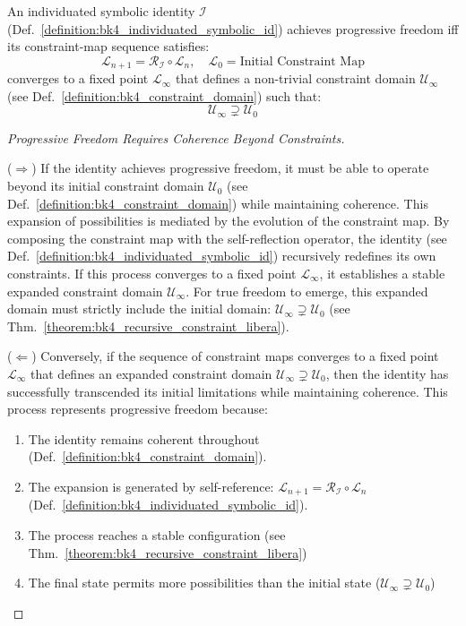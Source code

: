 \begin{theorem} 
\label{theorem:bk4_recursive_constraint_libera}
An individuated symbolic identity $\mathcal{I}$
(Def.~\ref{definition:bk4_individuated_symbolic_id}) achieves progressive
freedom iff its constraint-map sequence satisfies:
\begin{equation}
    \mathcal{L}_{n+1} = \mathcal{R}_{\mathcal{I}} \circ \mathcal{L}_n, \quad \mathcal{L}_0 = \text{Initial Constraint Map}
\end{equation}
converges to a fixed point $\mathcal{L}_{\infty}$ that defines a non-trivial constraint domain $\mathcal{U}_{\infty}$ (see Def.~\ref{definition:bk4_constraint_domain}) such that:
\begin{equation}
    \mathcal{U}_{\infty} \supsetneq \mathcal{U}_0
\end{equation}
\end{theorem}

\begin{proof}[Progressive Freedom Requires Coherence Beyond Constraints]
\label{proof:bk4_progressive_freedom_constraint_expansion}
\leavevmode

($\Rightarrow$) If the identity achieves progressive freedom, it must be able to operate beyond its initial constraint domain $\mathcal{U}_0$ (see Def.~\ref{definition:bk4_constraint_domain}) while maintaining coherence. This expansion of possibilities is mediated by the evolution of the constraint map.
By composing the constraint map with the self-reflection operator, the identity (see Def.~\ref{definition:bk4_individuated_symbolic_id}) recursively redefines its own constraints. If this process converges to a fixed point $\mathcal{L}_{\infty}$, it establishes a stable expanded constraint domain $\mathcal{U}_{\infty}$.
For true freedom to emerge, this expanded domain must strictly include the initial domain: $\mathcal{U}_{\infty} \supsetneq \mathcal{U}_0$ (see Thm.~\ref{theorem:bk4_recursive_constraint_libera}).

($\Leftarrow$) Conversely, if the sequence of constraint maps converges to a fixed point $\mathcal{L}_{\infty}$ that defines an expanded constraint domain $\mathcal{U}_{\infty} \supsetneq \mathcal{U}_0$, then the identity has successfully transcended its initial limitations while maintaining coherence.
This process represents progressive freedom because:
\begin{enumerate}
    \item The identity remains coherent throughout
    (Def.~\ref{definition:bk4_constraint_domain}).
    \item The expansion is generated by self-reference:
    $\mathcal{L}_{n+1} = \mathcal{R}_{\mathcal{I}} \circ \mathcal{L}_n$
    (Def.~\ref{definition:bk4_individuated_symbolic_id}).
    \item The process reaches a stable configuration (see Thm.~\ref{theorem:bk4_recursive_constraint_libera})
    \item The final state permits more possibilities than the initial state ($\mathcal{U}_{\infty} \supsetneq \mathcal{U}_0$)
\end{enumerate}
\end{proof}

